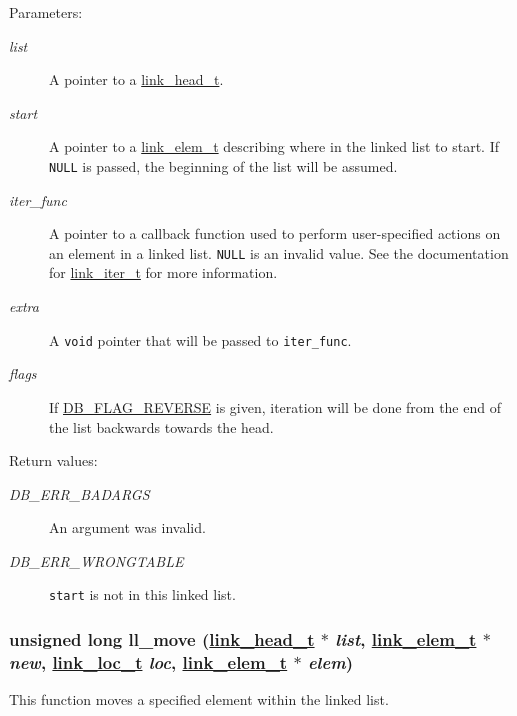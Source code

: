 \begin{Desc}
\item[Parameters:]
\begin{description}
\item[{\em list}]A pointer to a \hyperlink{group__dbprim__link_a0}{link\_\-head\_\-t}. \item[{\em start}]A pointer to a \hyperlink{group__dbprim__link_a1}{link\_\-elem\_\-t} describing where in the linked list to start. If {\tt NULL} is passed, the beginning of the list will be assumed. \item[{\em iter\_\-func}]A pointer to a callback function used to perform user-specified actions on an element in a linked list. {\tt NULL} is an invalid value. See the documentation for \hyperlink{group__dbprim__link_a2}{link\_\-iter\_\-t} for more information. \item[{\em extra}]A {\tt void} pointer that will be passed to {\tt iter\_\-func}. \item[{\em flags}]If \hyperlink{group__dbprim_a4}{DB\_\-FLAG\_\-REVERSE} is given, iteration will be done from the end of the list backwards towards the head.\end{description}
\end{Desc}
\begin{Desc}
\item[Return values:]
\begin{description}
\item[{\em DB\_\-ERR\_\-BADARGS}]An argument was invalid. \item[{\em DB\_\-ERR\_\-WRONGTABLE}]{\tt start} is not in this linked list. \end{description}
\end{Desc}
\hypertarget{group__dbprim__link_a7}{
\subsubsection[ll\_\-move]{\setlength{\rightskip}{0pt plus 5cm}unsigned long ll\_\-move (\hyperlink{dbprim_8h_a0}{link\_\-head\_\-t} $\ast$ {\em list}, \hyperlink{dbprim_8h_a1}{link\_\-elem\_\-t} $\ast$ {\em new}, \hyperlink{dbprim_8h_a4}{link\_\-loc\_\-t} {\em loc}, \hyperlink{dbprim_8h_a1}{link\_\-elem\_\-t} $\ast$ {\em elem})}}
\label{group__dbprim__link_a7}


This function moves a specified element within the linked list.

